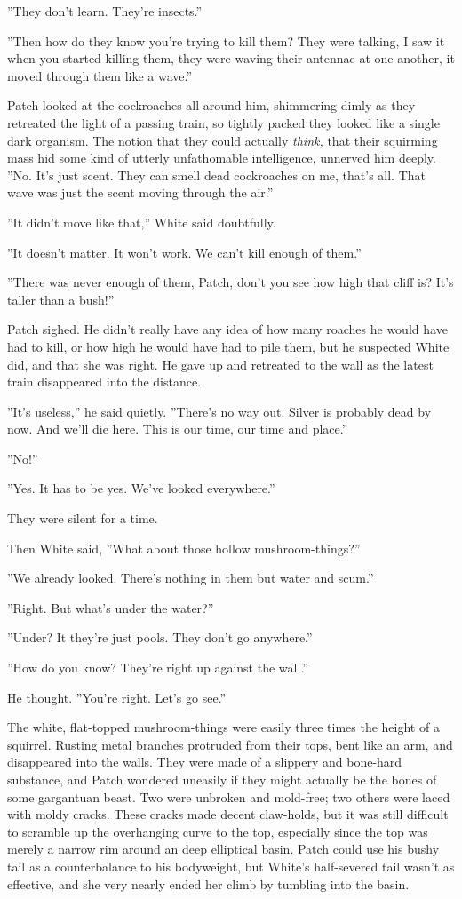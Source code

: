 \documentclass[11pt]{article}
\begin{document}
 ''They don't learn. They're insects.''\par
 ''Then how do they know you're trying to kill them? They were talking, I saw it when you started killing them, they were waving their antennae at one another, it moved through them like a wave.''\par
 Patch looked at the cockroaches all around him, shimmering dimly as they retreated the light of a passing train, so tightly packed they looked like a single dark organism. The notion that they could actually {\it think,} that their squirming mass hid some kind of utterly unfathomable intelligence, unnerved him deeply. ''No. It's just scent. They can smell dead cockroaches on me, that's all. That wave was just the scent moving through the air.''\par
 ''It didn't move like that,'' White said doubtfully.\par
 ''It doesn't matter. It won't work. We can't kill enough of them.''\par
 ''There was never enough of them, Patch, don't you see how high that cliff is? It's taller than a bush!''\par
 Patch sighed. He didn't really have any idea of how many roaches he would have had to kill, or how high he would have had to pile them, but he suspected White did, and that she was right. He gave up and retreated to the wall as the latest train disappeared into the distance.\par
 ''It's useless,'' he said quietly. ''There's no way out. Silver is probably dead by now. And we'll die here. This is our time, our time and place.''\par
 ''No!''\par
 ''Yes. It has to be yes. We've looked everywhere.''\par
 They were silent for a time.\par
 Then White said, ''What about those hollow mushroom-things?''\par
 ''We already looked. There's nothing in them but water and scum.''\par
 ''Right. But what's under the water?''\par
 ''Under? It %
 they're just pools. They don't go anywhere.''\par
 ''How do you know? They're right up against the wall.''\par
 He thought. ''You're right. Let's go see.''\par
 The white, flat-topped mushroom-things were easily three times the height of a squirrel. Rusting metal branches protruded from their tops, bent like an arm, and disappeared into the walls. They were made of a slippery and bone-hard substance, and Patch wondered uneasily if they might actually be the bones of some gargantuan beast. Two were unbroken and mold-free; two others were laced with moldy cracks. These cracks made decent claw-holds, but it was still difficult to scramble up the overhanging curve to the top, especially since the top was merely a narrow rim around an deep elliptical basin. Patch could use his bushy tail as a counterbalance to his bodyweight, but White's half-severed tail wasn't as effective, and she very nearly ended her climb by tumbling into the basin.\par
\end{document}
